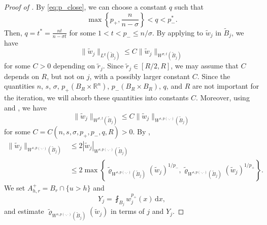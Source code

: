 \documentclass[11pt]{amsart}
\theoremstyle{plain}
\theoremstyle{definition}
\numberwithin{equation}{section}
\begin{document}
\begin{proof} [Proof of ]
By \eqref{eq:p_close}, we can choose a constant $q$ such that
\begin{equation} \label{eq:pq_close}
\max\left\lbrace p_+, \frac{n}{n-\sigma} \right\rbrace < q < p_-^{\ast}.
\end{equation}
Then, $q = t^{\ast} = \frac{nt}{n-\sigma t}$ for some $1 < t < p_- \leq n/\sigma$. By applying  to $\tilde{w}_j$ in $\tilde{B}_j$, we have
\begin{equation*}
\|\tilde{w}_j\|_{L^{q}(\tilde{B}_j)} \leq C \|\tilde{w}_j\|_{W^{\sigma, t}(\tilde{B}_j)}
\end{equation*}
for some $C > 0$ depending on $\tilde{r}_j$. Since $\tilde{r}_j \in [R/2, R]$, we may assume that $C$ depends on $R$, but not on $j$, with a possibly larger constant $C$. Since the quantities $n$, $s$, $\sigma$, $p_+(B_R \times \mathbb{R}^n)$, $p_-(B_R \times B_R)$, $q$, and $R$ are not important for the iteration, we will absorb these quantities into constants $C$. Moreover, using  and , we have
\begin{equation*}
\|\tilde{w}_j \|_{W^{\sigma, t}(\tilde{B}_j)} \leq C \|\tilde{w}_j \|_{W^{s,p(\cdot,\cdot)}(\tilde{B}_j)}
\end{equation*}
for some $C = C(n, s, \sigma, p_+, p_-, q, R) > 0$.
By ,
\begin{equation} \label{eq:max}
\begin{split}
\|\tilde{w}_j\|_{W^{s,p(\cdot,\cdot)}(\tilde{B}_j)}
&\leq 2|\tilde{w}_j|_{W^{s,p(\cdot,\cdot)}(\tilde{B}_j)} \\
&\leq 2\max \left\lbrace \tilde{\varrho}_{W^{s, p(\cdot,\cdot)}(\tilde{B}_j)}(\tilde{w}_j)^{1/p_-}, \tilde{\varrho}_{W^{s, p(\cdot,\cdot)}(\tilde{B}_j)}(\tilde{w}_j)^{1/p_+}\right\rbrace.
\end{split}
\end{equation}
We set $A_{h, r}^+ = B_r \cap \lbrace u > h \rbrace$ and 
\begin{equation*}
Y_j = \fint_{B_j} w_j^{p_+}(x) \,\mathrm{d}x,
\end{equation*}
and estimate $\tilde{\varrho}_{W^{s, p(\cdot,\cdot)}(\tilde{B}_j)}(\tilde{w}_j)$ in terms of $j$ and $Y_j$.


\end{proof}
\end{document}
